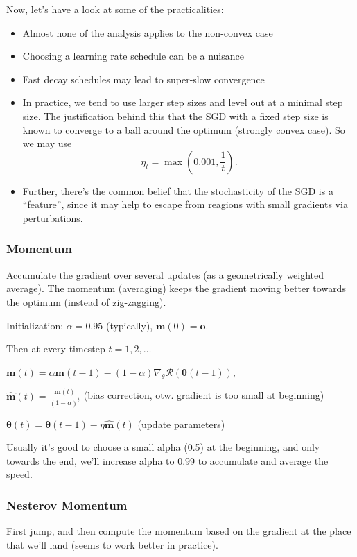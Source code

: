 \documentclass[a2paper,8pt]{extarticle}
\newcommand{\cR}{\mathcal{R}}
\renewcommand{\vec}[1]{\mathbf{#1}}
\newcommand{\vm}{\vec{m}}
\newcommand{\vo}{\vec{o}}
\newcommand{\vhm}{\widehat{\vec{m}}}
\newcommand{\vtheta}{\boldsymbol{\theta}}
\begin{document}
\begin{landscape}
\begin{multicols*}{7}
Now, let's have a look at some of the practicalities:
\begin{itemize}
  \item Almost none of the analysis applies to the non-convex case
  \item Choosing a learning rate schedule can be a nuisance
  \item Fast decay schedules may lead to super-slow convergence
  \item In practice, we tend to use larger step sizes and level out at a minimal
  step size. The justification behind this that the SGD with a fixed step size
  is known to converge to a ball around the optimum (strongly convex case). So
  we may use
  \[
  \eta_t=\max(0.001,\frac{1}{t}).
  \]
  \item Further, there's the common belief that the stochasticity of the SGD is
  a ``feature'', since it may help to escape from reagions with small gradients
  via perturbations.
\end{itemize}

\subsubsection{Momentum}

Accumulate the gradient over several updates (as a geometrically weighted
average). The momentum (averaging) keeps the gradient moving better towards the
optimum (instead of zig-zagging).

Initialization: $\alpha=0.95$ (typically), $\vm(0)=\vo$.

Then at every timestep $t=1,2,\ldots$

$
\vm(t)=\alpha \vm(t-1)-(1-\alpha)\nabla_\theta\cR(\vtheta(t-1)),
$

$
\vhm(t)=\frac{\vm(t)}{(1-\alpha)^t}
$ \quad(bias correction, otw. gradient is too small at beginning)

$
\vtheta(t)=\vtheta(t-1)-\eta\vhm(t)
$ \quad (update parameters)

Usually it's good to choose a small alpha (0.5) at the beginning, and only
towards the end, we'll increase alpha to 0.99 to accumulate and average the
speed.

\subsubsection{Nesterov Momentum}

First jump, and then compute the momentum based on the gradient at the place
that we'll land (seems to work better in practice).


\end{multicols*}
\end{landscape}
\end{document}
